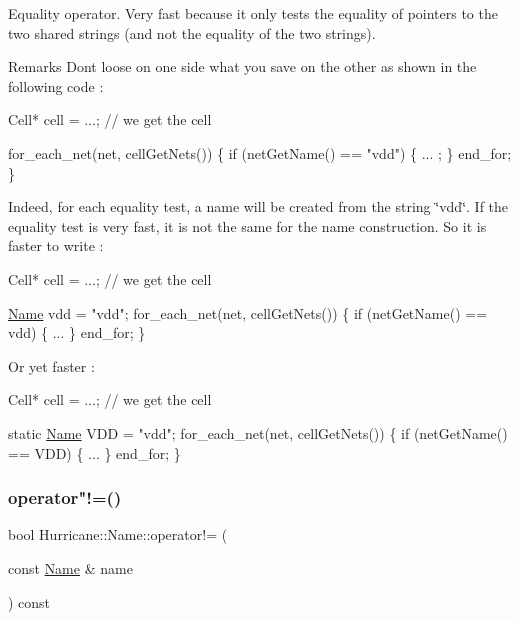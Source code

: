 Equality operator. Very fast because it only tests the equality of pointers to the two shared strings (and not the equality of the two strings).

\begin{DoxyRemark}{Remarks}
Don\textquotesingle{}t loose on one side what you save on the other as shown in the following code \+: 
\begin{DoxyCode}
Cell* cell = ...; \textcolor{comment}{// we get the cell}
 
for\_each\_net(net, cellGetNets()) \{
   \textcolor{keywordflow}{if} (netGetName() == \textcolor{stringliteral}{"vdd"}) \{
      ... ;
   \}
   end\_for;
\}
\end{DoxyCode}
 Indeed, for each equality test, a name will be created from the string \char`\"{}vdd\char`\"{}. If the equality test is very fast, it is not the same for the name construction. So it is faster to write \+: 
\begin{DoxyCode}
Cell* cell = ...; \textcolor{comment}{// we get the cell}
 
\mbox{\hyperlink{classHurricane_1_1Name_a42636ecb0d4d7d03eb881420a244038b}{Name}} vdd = \textcolor{stringliteral}{"vdd"};
for\_each\_net(net, cellGetNets()) \{
   \textcolor{keywordflow}{if} (netGetName() == vdd) \{
      ...
   \}
   end\_for;
\}
\end{DoxyCode}
 Or yet faster \+: 
\begin{DoxyCode}
Cell* cell = ...; \textcolor{comment}{// we get the cell}
 
\textcolor{keyword}{static} \mbox{\hyperlink{classHurricane_1_1Name_a42636ecb0d4d7d03eb881420a244038b}{Name}} VDD = \textcolor{stringliteral}{"vdd"};
for\_each\_net(net, cellGetNets()) \{
   \textcolor{keywordflow}{if} (netGetName() == VDD) \{
      ...
   \}
   end\_for;
\}
\end{DoxyCode}
 
\end{DoxyRemark}
\mbox{\label{classHurricane_1_1Name_aff97f0bcf698ad76f6f3c9a4c4833cc3}} 
\subsubsection{\texorpdfstring{operator"!=()}{operator!=()}}
{\footnotesize\ttfamily bool Hurricane\+::\+Name\+::operator!= (\begin{DoxyParamCaption}\item[{const \mbox{\hyperlink{classHurricane_1_1Name}{Name}} \&}]{name }\end{DoxyParamCaption}) const}

